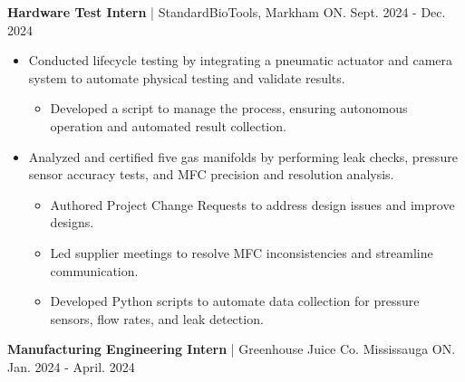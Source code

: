 \documentclass{article}
\begin{document}
\vspace{0cm}
\textbf{\hspace{-0.10cm} Hardware Test Intern} | StandardBioTools, Markham ON. \hspace {5.2cm} {\small Sept. 2024 - Dec. 2024}

\vspace{-0.2cm}
\begin{itemize}[leftmargin=1.5cm]

    \item {Conducted lifecycle testing by integrating a pneumatic actuator and camera system to automate physical testing and validate results.
    \vspace{-0.2cm}
    \begin{itemize} [label=$\circ$, leftmargin=0.5cm]
        \item {Developed a script to manage the process, ensuring autonomous operation and automated result collection.}
    \end{itemize}
    }


    \vspace{-0.2cm}
    \item Analyzed and certified five gas manifolds by performing leak checks, pressure sensor accuracy tests, and MFC precision and resolution analysis.
    \vspace{-0.2cm}
    \begin{itemize} [label=$\circ$, leftmargin=0.5cm]
        \item Authored Project Change Requests to address design issues and improve designs.
        \item Led supplier meetings to resolve MFC inconsistencies and streamline communication.
        \item Developed Python scripts to automate data collection for pressure sensors, flow rates, and leak detection.

    \end{itemize}
        
    

    
\end{itemize}


\textbf{\hspace{-0.10cm} Manufacturing Engineering Intern} | Greenhouse Juice Co. Mississauga ON. \hspace{2.2cm} {\small Jan. 2024 - April. 2024}
\end{document}
